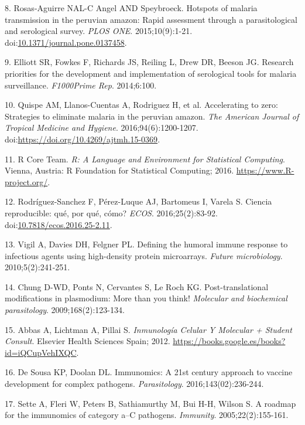 \documentclass[]{article}
\begin{document}
\hypertarget{ref-hotspots2015}{}
8. Rosas-Aguirre NAL-C Angel AND Speybroeck. Hotspots of malaria
transmission in the peruvian amazon: Rapid assessment through a
parasitological and serological survey. \emph{PLOS ONE}.
2015;10(9):1-21.
doi:\href{https://doi.org/10.1371/journal.pone.0137458}{10.1371/journal.pone.0137458}.

\hypertarget{ref-elliott2014}{}
9. Elliott SR, Fowkes F, Richards JS, Reiling L, Drew DR, Beeson JG.
Research priorities for the development and implementation of
serological tools for malaria surveillance. \emph{F1000Prime Rep}.
2014;6:100.

\hypertarget{ref-accelerate2016}{}
10. Quispe AM, Llanos-Cuentas A, Rodriguez H, et al. Accelerating to
zero: Strategies to eliminate malaria in the peruvian amazon. \emph{The
American Journal of Tropical Medicine and Hygiene}.
2016;94(6):1200-1207.
doi:\href{https://doi.org/https://doi.org/10.4269/ajtmh.15-0369}{https://doi.org/10.4269/ajtmh.15-0369}.

\hypertarget{ref-R}{}
11. R Core Team. \emph{R: A Language and Environment for Statistical
Computing}. Vienna, Austria: R Foundation for Statistical Computing;
2016. \url{https://www.R-project.org/}.

\hypertarget{ref-CienciaReproducible2016}{}
12. Rodríguez-Sanchez F, Pérez-Luque AJ, Bartomeus I, Varela S. Ciencia
reproducible: qué, por qué, cómo? \emph{ECOS}. 2016;25(2):83-92.
doi:\href{https://doi.org/10.7818/ecos.2016.25-2.11}{10.7818/ecos.2016.25-2.11}.

\hypertarget{ref-vigil2010}{}
13. Vigil A, Davies DH, Felgner PL. Defining the humoral immune response
to infectious agents using high-density protein microarrays.
\emph{Future microbiology}. 2010;5(2):241-251.

\hypertarget{ref-leroch2009postmod}{}
14. Chung D-WD, Ponts N, Cervantes S, Le Roch KG. Post-translational
modifications in plasmodium: More than you think! \emph{Molecular and
biochemical parasitology}. 2009;168(2):123-134.

\hypertarget{ref-abbas2012}{}
15. Abbas A, Lichtman A, Pillai S. \emph{Inmunología Celular Y Molecular
+ Student Consult}. Elsevier Health Sciences Spain; 2012.
\url{https://books.google.es/books?id=iQCupVehIXQC}.

\hypertarget{ref-immunomics2016}{}
16. De Sousa KP, Doolan DL. Immunomics: A 21st century approach to
vaccine development for complex pathogens. \emph{Parasitology}.
2016;143(02):236-244.

\hypertarget{ref-sette2005}{}
17. Sette A, Fleri W, Peters B, Sathiamurthy M, Bui H-H, Wilson S. A
roadmap for the immunomics of category a--C pathogens. \emph{Immunity}.
2005;22(2):155-161.
\end{document}
